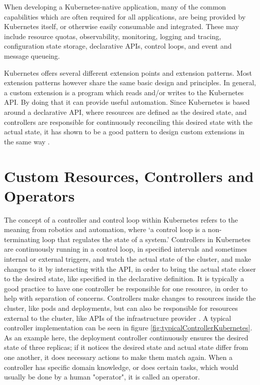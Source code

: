 When developing a Kubernetes-native application,
many of the common capabilities which are often required for all applications,
are being provided by Kubernetes itself, or otherwise easily consumable and integrated.
These may include resource quotas, observability, monitoring, logging and tracing,
configuration state storage, declarative APIs, control loops, and event and message queueing.

Kubernetes offers several different extension points and extension patterns.
Most extension patterns however share the same basic design and principles.
In general, a custom extension is a program which reads and/or writes
to the Kubernetes API. By doing that it can provide useful automation.
Since Kubernetes is based around a declarative API,
where resources are defined as the desired state,
and controllers are responsible for continuously reconciling this
desired state with the actual state,
it has shown to be a good pattern to design custom extensions in the same way
\autocite{extendKubernetes}.

\section{Custom Resources, Controllers and Operators}
The concept of a controller and control loop within Kubernetes refers to the
meaning from robotics and automation, where
\enquote*{a control loop is a non-terminating loop that regulates the state of a system.}
\autocite{controllersKubernetes}
Controllers in Kubernetes are continuously running in a control loop,
in specified intervals and sometimes internal or external triggers, 
and watch the actual state of the cluster,
and make changes to it by interacting with the API,
in order to bring the actual state closer to the desired state,
like specified in the declarative definition.
It is typically a good practice to have one controller
be responsible for one resource, 
in order to help with separation of concerns.
Controllers make changes to resources inside the cluster,
like pods and deployments,
but can also be responsible for resources external to the cluster,
like APIs of the infrastructure provider
\autocite{controllersKubernetes}.
A typical controller implementation can be seen in figure
\ref{fig:typicalControllerKubernetes}.
As an example here, the deployment controller continuously ensures the desired state
of three replicas; if it notices the desired state and actual state differ
from one another, it does necessary actions to make them match again.
When a controller has specific domain knowledge,
or does certain tasks, which would usually be done by a human "operator",
it is called an operator.

